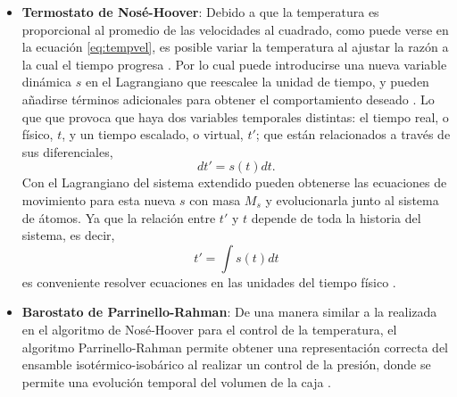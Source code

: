\begin{itemize}
    \item \textbf{Termostato de Nosé-Hoover}:
        Debido a que la temperatura es proporcional al promedio de las 
        velocidades al cuadrado, como puede verse en la ecuación \ref{eq:tempvel}, 
        es posible variar la temperatura al ajustar la razón a la cual el tiempo 
        progresa \cite{nose1984a}. Por lo cual puede introducirse una nueva 
        variable dinámica $s$ en el Lagrangiano que reescalee la unidad de 
        tiempo, y pueden añadirse términos adicionales para obtener el 
        comportamiento deseado \cite{rapaport2004}. Lo que que provoca que haya
        dos variables temporales distintas: el tiempo real, o físico, $t$, y un 
        tiempo escalado, o virtual, $t'$; que están relacionados a través de sus 
        diferenciales,
        \begin{equation}
            dt' = s(t) dt.
        \end{equation}
        Con el Lagrangiano del sistema extendido pueden obtenerse las ecuaciones 
        de movimiento para esta nueva  $s$ con masa $M_s$ y 
        evolucionarla junto al sistema de átomos. Ya que la relación entre $t'$ y
        $t$ depende de toda la historia del sistema, es decir,
        \begin{equation}
            t' = \int s(t) dt
        \end{equation}
        es conveniente resolver ecuaciones en las unidades del tiempo físico 
        \cite{nose1984b, hoover1985}.
    
    \item \textbf{Barostato de Parrinello-Rahman}:
        De una manera similar a la realizada en el algoritmo de Nosé-Hoover para 
        el control de la temperatura, el algoritmo Parrinello-Rahman permite
        obtener una representación correcta del ensamble isotérmico-isobárico al 
        realizar un control de la presión, donde se permite una evolución 
        temporal del volumen de la caja \cite{parrinello-rahman}.
\end{itemize}
